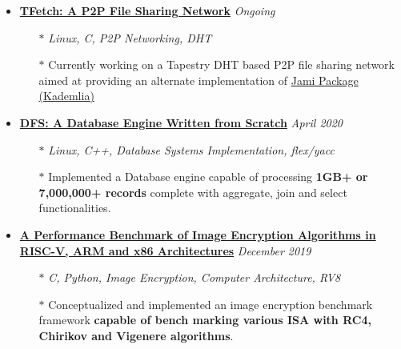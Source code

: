 \documentclass[10pt,a4paper]{article}
\begin{document}
\begin{tcolorbox}[enhanced,breakable,attach boxed title to top left={yshift=-3mm,yshifttext=-1mm},
		colback=aliceblue,colframe=blue,colbacktitle=blue,
		title=Projects ,fonttitle=\large\bfseries,
	boxed title style={size=small,colframe=blue} ]

    \begin{itemize}[noitemsep,nolistsep,leftmargin=0pt]
    
    \item{\textbf{\href{https://gitlab.com/r0ck3r008/tfetch}{TFetch: A P2P File Sharing Network}} \hfill \textit{Ongoing}}
    \begin{itemize}[leftmargin=*]
    \setlength\itemsep{-0.25em}
        \item[$\ast$]{\textit{Linux, C, P2P Networking, DHT}}
        \item[$\ast$]{Currently working on a Tapestry DHT based P2P file sharing network aimed at providing an alternate implementation of \href{https://jami.net/}{Jami Package (Kademlia)}}
    \end{itemize}
    
    \item{\textbf{\href{https://gitlab.com/r0ck3r008/database-from-scratch}{DFS: A Database Engine Written from Scratch}} \hfill \textit{April 2020}}
    \begin{itemize}[leftmargin=*]
    \setlength\itemsep{-0.25em}
        \item[$\ast$]{\textit{Linux, C++, Database Systems Implementation, flex/yacc}}
        \item[$\ast$]{Implemented a Database engine capable of processing \textbf{1GB+ or 7,000,000+ records} complete with aggregate, join and select functionalities.}
    \end{itemize}
    
	\item{\textbf{\href{https://gitlab.com/r0ck3r008/cap-proj}{A Performance Benchmark of Image Encryption Algorithms in RISC-V, ARM and x86 Architectures}} \hfill \textit{December 2019}}
	 \begin{itemize}[leftmargin=*]
	\setlength\itemsep{-0.25em}
	    \item[$\ast$]{\textit{C, Python, Image Encryption, Computer Architecture, RV8}}
		\item[$\ast$]{Conceptualized and implemented an image encryption benchmark framework \textbf{capable of bench marking various ISA with RC4, Chirikov and Vigenere algorithms}.}
	\end{itemize}


\end{itemize}
\end{tcolorbox}
\end{document}
